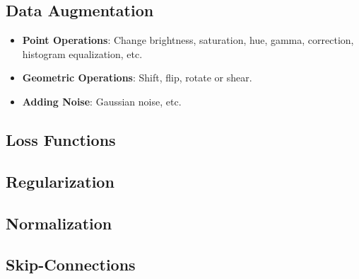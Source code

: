 \documentclass[a4paper]{article}
\begin{document}
\subsection{Data Augmentation}

\begin{itemize}
	\item \textbf{Point Operations}: Change brightness, saturation, hue, gamma, correction, histogram equalization, etc.
	\item \textbf{Geometric Operations}: Shift, flip, rotate or shear.
	\item \textbf{Adding Noise}: Gaussian noise, etc.
\end{itemize}

\subsection{Loss Functions}

\subsection{Regularization}

\subsection{Normalization}

\subsection{Skip-Connections}



%
%
\end{document}
